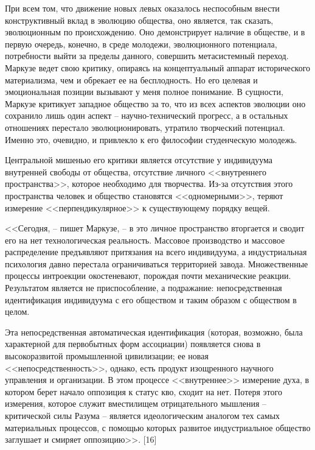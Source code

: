 \documentclass{book}
\begin{document}
При всем том, что движение новых левых оказалось неспо­собным внести конструктивный вклад в эволюцию общества, оно является, так сказать, эволюционным по происхождению. Оно демонстрирует наличие в обществе, и в первую очередь, конечно, в среде молодежи, эволюционного потенциала, потребности выйти за пределы данного, совершить метасистемный переход. Маркузе ведет свою критику, опираясь на кон­цептуальный аппарат исторического материализма, чем и обре­кает ее на бесплодность. Но его целевая и эмоциональная пози­ции вызывают у меня полное понимание. В сущности, Маркузе критикует западное общество за то, что из всех аспектов эво­люции оно сохранило лишь один аспект -- научно-технический прогресс, а в остальных отношениях перестало эволюциони­ровать, утратило творческий потенциал. Именно это, очевид­но, и привлекло к его философии студенческую молодежь.

Центральной мишенью его критики является отсутствие у индивидуума внутренней свободы от общества, отсутствие лич­ного <<внутреннего пространства>>, которое необходимо для творчества. Из-за отсутствия этого пространства человек и об­щество становятся <<одномерными>>, теряют измерение <<пер­пендикулярное>> к существующему порядку вещей.

<<Сегодня, -- пишет Маркузе, -- в это личное пространство вторгается и сводит его на нет технологическая реальность. Массовое производство и массовое распределение предъявля­ют притязания на всего  индивидуума, а индустриальная психо­логия давно перестала ограничиваться территорией завода. Множественные процессы интроекции окостеневают, порож­дая почти механические реакции. Результатом является не при­способление, а подражание:  непосредственная идентификация индивидуума с его  обществом и таким образом с обществом в целом.

Эта непосредственная автоматическая идентификация (ко­торая, возможно, была характерной для первобытных форм ассоциации) появляется снова в высокоразвитой промышлен­ной цивилизации; ее новая <<непосредственность>>, однако, есть продукт изощренного научного управления и организа­ции. В этом процессе <<внутреннее>> измерение духа, в котором берет начало оппозиция к статус кво, сходит на нет. Потеря этого измерения, которое служит вместилищем отрицатель­ного мышления -- критической силы Разума -- является иде­ологическим аналогом тех самых материальных процессов, с помощью которых развитое индустриальное общество заглу­шает и смиряет оппозицию>>. [16]
\end{document}

